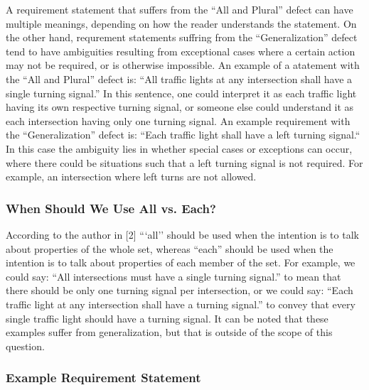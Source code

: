 \documentclass[letterpaper,12pt]{article}
\begin{document}
A requirement statement that suffers from the ``All and Plural'' defect can have
multiple meanings, depending on how the reader understands the statement. On the
other hand, requrement statements suffring from the ``Generalization'' defect
tend to have ambiguities resulting from exceptional cases where a certain action
may not be required, or is otherwise impossible.
An example of a atatement with the ``All and Plural'' defect is: ``All traffic
lights at any intersection shall have a single turning signal.'' In this
sentence, one could interpret it as each traffic light having its own respective
turning signal, or someone else could understand it as each intersection having
only one turning signal.
An example requirement with the ``Generalization'' defect is: ``Each traffic
light shall have a left turning signal.`` In this case the ambiguity lies in
whether special cases or exceptions can occur, where there could be situations
such that a left turning signal is not required. For example, an intersection
where left turns are not allowed.

\subsubsection{When Should We Use All vs. Each?}

According to the author in [2] ```all'' should be used when the intention is to
talk about properties of the whole set, whereas ``each'' should be used when the
intention is to talk about properties of each member of the set. For example, we
could say: ``All intersections must have a single turning signal.'' to mean that
there should be only one turning signal per intersection, or we could say:
``Each traffic light at any intersection shall have a turning signal.'' to
convey that every single traffic light should have a turning signal. It can be
noted that these examples suffer from generalization, but that is outside of the
scope of this question.

\subsubsection{Example Requirement Statement}
\end{document}
